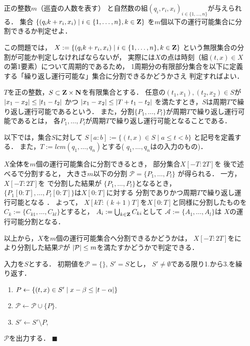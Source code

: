 \begin{timeSpecifiedProblemOnLine}
  正の整数$m$（巡査の人数を表す）
  と自然数の組$(q_i, r_i, x_i)_{ i \in \{ 1, \ldots, n \} }$が与えられる．
  集合
  $\{ (q_i k + r_i, x_i) \mid i \in \{1, \ldots, n\}, k \in \mathbf Z \}$
  を$m$個以下の運行可能集合に分割できるか判定せよ．
\end{timeSpecifiedProblemOnLine}


この問題では，
$X := \{ (q_i k + r_i, x_i) \mid i \in \{1, \ldots, n\}, k \in \mathbf Z \}$
という無限集合の分割が可能か判定しなければならないが，
実際には$X$の点は時刻（組$(t, x) \in X$の第1要素）について周期的であるため，
1周期分の有限部分集合を以下に定義する「繰り返し運行可能な」集合に分割できるかどうかさえ
判定すればよい．


\begin{defi}
  $T$を正の整数，$S \subset \mathbf Z \times \mathbf N$を有限集合とする．
  任意の$(t_1, x_1), (t_2, x_2) \in S$が
  $\lvert{x_1 - x_2}\rvert \leq \lvert{t_1 - t_2}\rvert$
  かつ
  $\lvert{x_1 - x_2}\rvert \leq \lvert{T + t_1 - t_2}\rvert$
  を満たすとき，$S$は周期$T$で繰り返し運行可能であるという．
  また，分割$\{ P_1, \ldots, P_l \}$が周期$T$で繰り返し運行可能であるとは，
  各$P_1, \ldots, P_l$が周期$T$で繰り返し運行可能となることである．
\end{defi}



以下では，集合$S$に対して
$S[a:b] := \{ (t, x) \in S \mid a \leq t < b \}$
と記号を定義する．
また，$T := lcm(q_1, \ldots, q_n)$とする(
$q_1, \ldots, q_n$は{\timeSpecifiedPatProbOnLine}の入力のもの)．


$X$全体を$m$個の運行可能集合に分割できるとき，
部分集合$X[-T: 2T]$を
後で述べる{\setPartitionAlgorithm}で分割すると，
大きさ$m$以下の分割 $\mathcal{P} = \{ P_1, \ldots, P_l \}$ が得られる．
%
一方，
$X[-T: 2T]$を
{\setPartitionAlgorithm}で分割した結果が
$\{ P_1, \ldots, P_l \}$となるとき，
$\{ P_1[0:T], \ldots, P_l[0:T] \}$は$X[0:T]$に対する
分割でありかつ周期$T$で繰り返し運行可能となる
．
よって，
$X[kT:(k + 1)T]$を$X[0:T]$と同様に分割したものを
$C_k := \{ C_{k1}, \ldots, C_{kl} \}$とすると，
$A_i := \bigcup_{k \in \mathbf Z} C_{ki}$として
$\mathcal{A} := \{ A_1, \ldots, A_l \}$は
$X$の運行可能分割となる．


以上から，$X$を$m$個の運行可能集合へ分割できるかどうかは，
$X[-T:2T]$を{\setPartitionAlgorithm}により分割した結果$\mathcal{P}$が
$\lvert{\mathcal{P}}\rvert \leq m$を満たすかどうかで判定できる．



\begin{greedyAlgorithmForTimeSpecifiedProblemOnLine}
  入力を$S$とする．
  初期値を$\mathcal{P} = \{\}$, $S' = S$とし，
  $S' \neq \emptyset$である限り1.から3.を繰り返す．
  \begin{enumerate}
    \item $P \gets
      \{ (t, x) \in S' \mid x - \beta \leq \lvert{t - \alpha}\rvert \}$
    \item $\mathcal{P} \gets \mathcal{P} \cup \{ P \}$.
    \item $S' \gets S' \setminus P$, 
  \end{enumerate}
  $\mathcal{P}$を出力する．
  $\blacksquare$
\end{greedyAlgorithmForTimeSpecifiedProblemOnLine}

